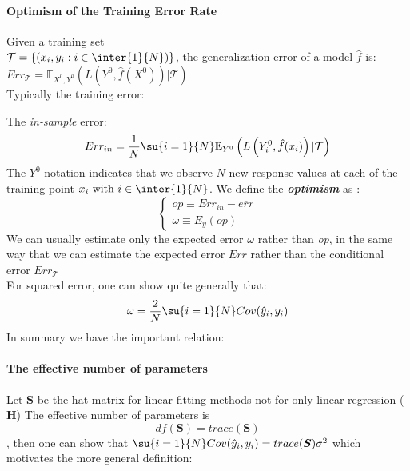 \paragraph{Optimism of the Training Error Rate}
Given a training set\\ $\mathcal{T}=\{(x_{i},y_{i}:i\in\inter{1}{N})\}$, the generalization error of 
a model $\hat{f}$ is:
$Err_{\mathcal{T}}=\mathbb{E}_{X^{0},Y^{0}}\left(L(Y^{0},\hat{f}(X^{0}))|\mathcal{T}\right)$\\
Typically the training error:
\begin{center}
\end{center}
The \emph{in-sample} error:
$$ Err_{in} = \dfrac{1}{N}\su{{i=1}}{N}\mathbb{E}_{Y^{0}}\left(L\left(Y_{i}^{0},\hat{f}(x_{i})
\right)|\mathcal{T}\right)$$
The $Y^{0}$ notation indicates that we observe $N$ new response values at each of the training
point $x_{i}\text{ with }i\in\inter{1}{N}$. We define the \emph{\textbf{optimism}} as :
$$
\begin{cases}
	op \equiv Err_{in}-\overline{err}\\
	\omega \equiv E_{y}(op)
\end{cases}
$$
We can usually estimate only the expected error $\omega$ rather than \emph{op}, in the same way
that we can estimate the expected error $Err$ rather than the conditional error $Err_{\mathcal{T}
}$\\
For squared error, one can show quite generally that:
$$ \omega=\dfrac{2}{N}\su{{i=1}}{N}Cov(\hat{y}_{i},y_{i})$$
In summary we have the important relation:
\begin{center}
\end{center}


\paragraph{The effective number of parameters}
Let $\bm{S}$ be the hat matrix for linear fitting methods not for only linear regression ($\bm{H}$) 
The effective number of parameters is 
$$ df(\bm{S}) = trace(\bm{S})$$
, then one can show that $\su{{i=1}}{N}Cov(\hat{y}_{i},y_{i})=trace(\bm{S})\sigma^{2}$ which 
motivates the more general definition:
\begin{center}
\end{center}

